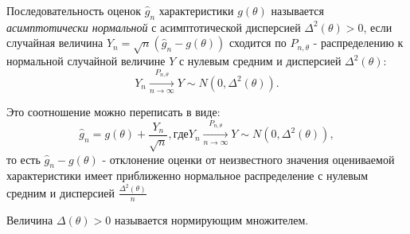 \begin{definition}
  Последовательность оценок $\hat{g}_n$ характеристики $g(\theta)$ называется \textit{асимптотически нормальной} с асимптотической дисперсией $\Delta^2(\theta) > 0$, если случайная величина $Y_n = \sqrt{n}(\hat{g}_n - g(\theta))$ сходится по $P_{n, \theta}$ - распределению к нормальной случайной величине $Y$ с нулевым средним и дисперсией $\Delta^2(\theta)$:
  \[
    Y_n \xrightarrow[n \to \infty]{P_{n, \theta}} Y \sim N(0, \Delta^2(\theta))
  .\]
\end{definition}

Это соотношение можно переписать в виде:
\[
  \hat{g}_n = g(\theta) + \frac{Y_n}{\sqrt{n}}, где Y_n \xrightarrow[n \to \infty]{P_{n, \theta}} Y \sim N(0, \Delta^2(\theta))
,\]
то есть
$\hat{g}_n - g(\theta)$ - отклонение оценки от неизвестного значения оцениваемой характеристики имеет приближенно нормальное распределение с нулевым средним и дисперсией $\frac{\Delta^2(\theta)}{n}$

\begin{definition}
  Величина $\Delta(\theta) > 0$ называется нормирующим множителем.
\end{definition}

